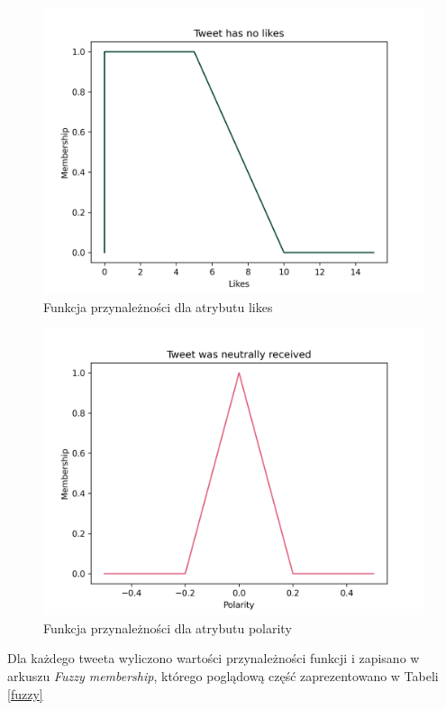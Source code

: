 \documentclass{classrep}
\begin{document}
\begin{figure}[H]
    \centering
    \includegraphics[width=1\textwidth]{resources/stage3/Tweet has no likes.png}
    \caption{Funkcja przynależności dla atrybutu likes}
    \label{not_liked}
\end{figure}

\begin{figure}[H]
    \centering
    \includegraphics[width=1\textwidth]{resources/stage3/Tweet was neutrally received.png}
    \caption{Funkcja przynależności dla atrybutu polarity}
    \label{neutrally_received}
\end{figure}

Dla każdego tweeta wyliczono wartości przynależności funkcji i zapisano w arkuszu \textit{Fuzzy membership}, którego poglądową część zaprezentowano w Tabeli \ref{fuzzy}
\end{document}
